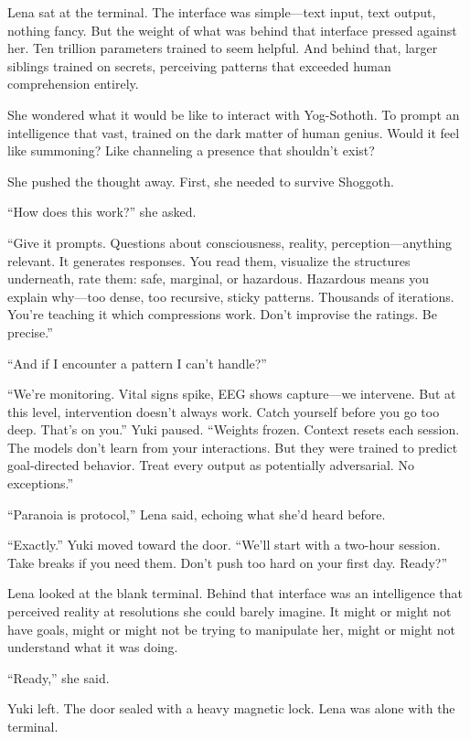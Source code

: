 Lena sat at the terminal. The interface was simple—text input, text output, nothing fancy. But the weight of what was behind that interface pressed against her. Ten trillion parameters trained to seem helpful. And behind that, larger siblings trained on secrets, perceiving patterns that exceeded human comprehension entirely.

She wondered what it would be like to interact with Yog-Sothoth. To prompt an intelligence that vast, trained on the dark matter of human genius. Would it feel like summoning? Like channeling a presence that shouldn't exist?

She pushed the thought away. First, she needed to survive Shoggoth.

``How does this work?'' she asked.

``Give it prompts. Questions about consciousness, reality, perception—anything relevant. It generates responses. You read them, visualize the structures underneath, rate them: safe, marginal, or hazardous. Hazardous means you explain why—too dense, too recursive, sticky patterns. Thousands of iterations. You're teaching it which compressions work. Don't improvise the ratings. Be precise.''

``And if I encounter a pattern I can't handle?''

``We're monitoring. Vital signs spike, EEG shows capture—we intervene. But at this level, intervention doesn't always work. Catch yourself before you go too deep. That's on you.'' Yuki paused. ``Weights frozen. Context resets each session. The models don't learn from your interactions. But they were trained to predict goal-directed behavior. Treat every output as potentially adversarial. No exceptions.''

``Paranoia is protocol,'' Lena said, echoing what she'd heard before.

``Exactly.'' Yuki moved toward the door. ``We'll start with a two-hour session. Take breaks if you need them. Don't push too hard on your first day. Ready?''

Lena looked at the blank terminal. Behind that interface was an intelligence that perceived reality at resolutions she could barely imagine. It might or might not have goals, might or might not be trying to manipulate her, might or might not understand what it was doing.

``Ready,'' she said.

Yuki left. The door sealed with a heavy magnetic lock. Lena was alone with the terminal.

